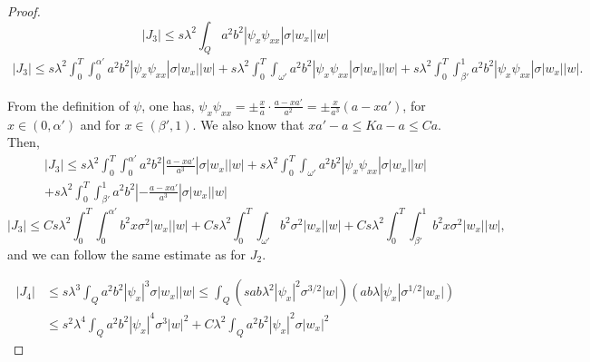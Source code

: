 \documentclass[10pt,a4paper]{amsart}
\begin{document}
\begin{proof}
    $$|J_3|\leq s\lambda^2\int_Q a^2b^2|\psi_x\psi_{xx}| \sigma |w_x| |w|$$
    \begin{multline*}
	|J_3|\leq s\lambda^2\int_0^T \int_0^{\alpha'}          a^2b^2|\psi_x\psi_{xx}| \sigma |w_x| |w| +  s\lambda^2\int_0^T\int_{\omega'} a^2b^2|\psi_x\psi_{xx}| \sigma |w_x| |w|
	+ s\lambda^2\int_0^T \int_{\beta'}^1 a^2b^2|\psi_x\psi_{xx}| \sigma |w_x| |w|.
    \end{multline*}
    
    From the definition of $\psi$, one has,
    $\psi_x\psi_{xx}=\pm \frac{x}{a}\cdot \frac{a-xa'}{a^2}=\pm \frac{x}{a^3}(a-xa')$, for $x\in (0,\alpha')$ and for $x\in (\beta',1)$.
    We also know that $xa'-a\leq Ka-a\leq Ca$. Then,
    \begin{multline*}
		|J_3|\leq s\lambda^2\int_0^T \int_0^{\alpha'} a^2b^2\left|  \frac{a-xa'}{a^3} \right| \sigma |w_x| |w| +  s\lambda^2\int_0^T\int_{\omega'} a^2b^2|\psi_x\psi_{xx}| \sigma |w_x| |w|\\
		+ s\lambda^2\int_0^T \int_{\beta'}^1 a^2b^2\left| - \frac{a-xa'}{a^3} \right| \sigma |w_x| |w|
    \end{multline*}
    $$|J_3|\leq Cs\lambda^2\int_0^T \int_0^{\alpha'} b^2x \sigma^2 |w_x| |w| +  Cs\lambda^2\int_0^T\int_{\omega'} b^2 \sigma^2 |w_x| |w| +C s\lambda^2\int_0^T \int_{\beta'}^1 b^2x \sigma^2 |w_x| |w|,$$
    and we can follow the same estimate as for $J_2$. 
 
    \begin{equation*}
    \begin{split}
    |J_4| &\leq s\lambda^3\int_Q a^2b^2|\psi_x|^3 \sigma |w_x|  |w|\leq \int_{Q} \left( sab\lambda^{2}|\psi_x|^2\sigma^{3/2}|w|\right)\left( ab\lambda|\psi_x|\sigma^{1/2}|w_x| \right) \\
    &\leq s^2\lambda^4\int_Qa^2b^2|\psi_x|^4 \sigma^3 |w|^2+C\lambda^2\int_{Q} a^2b^2|\psi_x|^2 \sigma |w_x|^2
    \end{split}    
    \end{equation*}
\end{proof}
\end{document}
